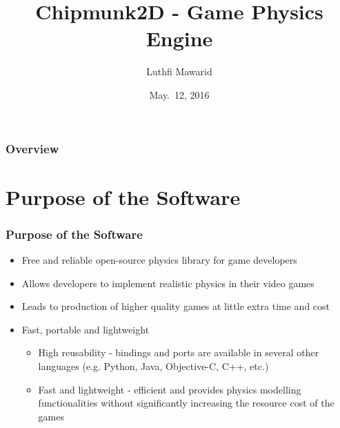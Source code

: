 \documentclass{beamer}
\title{Chipmunk2D - Game Physics Engine}
\author[Slide \thepage~of \pageref{TotPages}] %
{Luthfi Mawarid}
\institute[McMaster University] %
{
  Computing and Software Department\\
  Faculty of Engineering\\
  McMaster University
}
\date[May 12, 2016] %
{May.\ 12, 2016}
\begin{document}
\begin{frame}

\titlepage

\end{frame}


\begin{frame}

\frametitle{Overview}
\tableofcontents


\end{frame}


\section[Purpose]{Purpose of the Software}


\begin{frame}

\frametitle{Purpose of the Software}

\begin{itemize}
	\item Free and reliable open-source physics library for game developers
	\item Allows developers to implement realistic physics in their video games
	\item Leads to production of higher quality games at little extra time and cost
	\item Fast, portable and lightweight
	\begin{itemize}
		\item High reusability - bindings and ports are available in several other languages (e.g. Python, Java, Objective-C, C++, etc.)
		\item Fast and lightweight - efficient and provides physics modelling functionalities without significantly increasing the resource cost of the games
	\end{itemize}
\end{itemize}

\end{frame}

\end{document}
